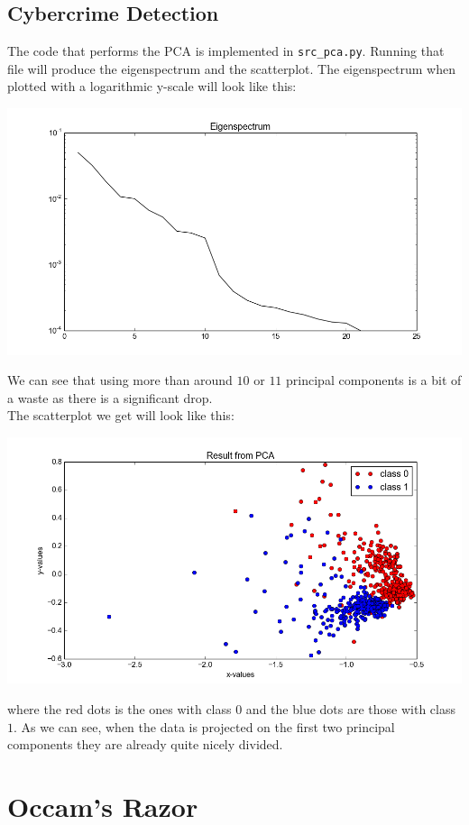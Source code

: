 \documentclass[a4paper]{article}
\begin{document}
\subsection{Cybercrime Detection}
The code that performs the PCA is implemented in \texttt{src\_pca.py}. Running that file will produce the eigenspectrum and the scatterplot. The eigenspectrum when plotted with a logarithmic y-scale will look like this:
\begin{center}
\includegraphics[scale=0.5]{fig2}
\end{center}
We can see that using more than around $10$ or $11$ principal components is a bit of a waste as there is a significant drop. \\
The scatterplot we get will look like this:
\begin{center}
\includegraphics[scale=0.5]{fig1}
\end{center}
where the red dots is the ones with class $0$ and the blue dots are those with class $1$. As we can see, when the data is projected on the first two principal components they are already quite nicely divided.

\section{Occam’s Razor}
\end{document}
